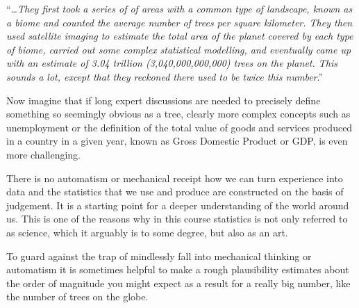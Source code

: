 \documentclass[
  letterpaper,
]{scrbook}
\begin{document}
``\ldots{}\emph{They first took a series of of areas with a common type
of landscape, known as a biome and counted the average number of trees
per square kilometer. They then used satellite imaging to estimate the
total area of the planet covered by each type of biome, carried out some
complex statistical modelling, and eventually came up with an estimate
of 3.04 trillion (3,040,000,000,000) trees on the planet. This sounds a
lot, except that they reckoned there used to be twice this number}.''

Now imagine that if long expert discussions are needed to precisely
define something so seemingly obvious as a tree, clearly more complex
concepts such as unemployment or the definition of the total value of
goods and services produced in a country in a given year, known as Gross
Domestic Product or GDP, is even more challenging.

There is no automatism or mechanical receipt how we can turn experience
into data and the statistics that we use and produce are constructed on
the basis of judgement. It is a starting point for a deeper
understanding of the world around us. This is one of the reasons why in
this course statistics is not only referred to as science, which it
arguably is to some degree, but also as an art.

To guard against the trap of mindlessly fall into mechanical thinking or
automatism it is sometimes helpful to make a rough plausibility
estimates about the order of magnitude you might expect as a result for
a really big number, like the number of trees on the globe.
\end{document}

